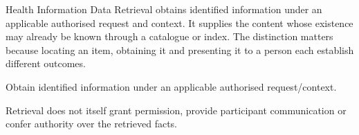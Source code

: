 Health Information Data Retrieval obtains identified information under an applicable authorised request and context. It supplies the content whose existence may already be known through a catalogue or index. The distinction matters because locating an item, obtaining it and presenting it to a person each establish different outcomes.



Obtain identified information under an applicable authorised request/\allowbreak{}context.



Retrieval does not itself grant permission, provide participant communication or confer authority over the retrieved facts.


